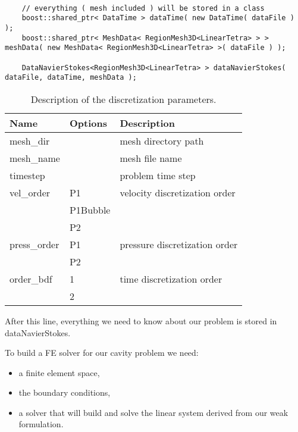 \begin{verbatim}

    // everything ( mesh included ) will be stored in a class
    boost::shared_ptr< DataTime > dataTime( new DataTime( dataFile ) );
    boost::shared_ptr< MeshData< RegionMesh3D<LinearTetra> > > meshData( new MeshData< RegionMesh3D<LinearTetra> >( dataFile ) );

    DataNavierStokes<RegionMesh3D<LinearTetra> > dataNavierStokes( dataFile, dataTime, meshData );

\end{verbatim}

\begin{table}
\begin{center}
\begin{tabular}{|l|l|l|}
\hline
Name & Options & Description \\
\hline \hline
mesh\_dir & & mesh directory path \\ \hline
mesh\_name & & mesh file name \\ \hline
timestep & & problem time step \\ \hline
vel\_order & P1 & velocity discretization order \\ \
& P1Bubble & \\
& P2 & \\ \hline
press\_order & P1 & pressure discretization order \\
& P2 & \\ \hline
order\_bdf & 1 & time discretization order \\
& 2 & \\ \hline
\end{tabular}
\end{center}
\caption{ Description of the discretization parameters.
}
\label{table-bcparams}
\end{table}


\noindent After this line, everything we need to know about our problem is stored
in dataNavierStokes.

To build a FE solver for our cavity problem we need:
\begin{itemize}
\item a finite element space,
\item the boundary conditions,
\item a solver that will build and solve the linear system derived from our weak formulation.
\end{itemize}

